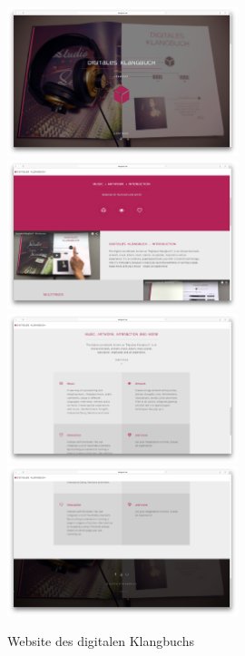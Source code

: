 


\begin{figure}[H]
\centering
\caption{Website des digitalen Klangbuchs}
\includegraphics[width=0.6\textwidth]{100_anhang/website1.png}
\includegraphics[width=0.6\textwidth]{100_anhang/website2.png}
\includegraphics[width=0.6\textwidth]{100_anhang/website3.png}
\includegraphics[width=0.6\textwidth]{100_anhang/website4.png}
\end{figure}



